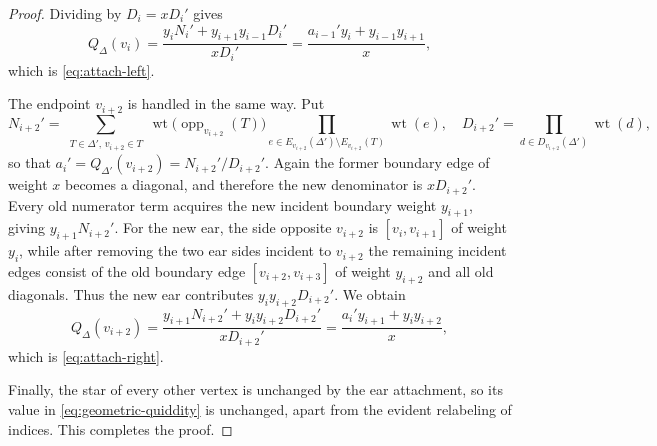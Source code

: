 \documentclass[amstex,11pt,reqno]{amsart}
\newtheorem{proposition}[theorem]{Proposition}
\theoremstyle{definition}
\newcommand{\wt}{\operatorname{wt}}
\newcommand{\ba}{\bm{a}}
\begin{document}
\begin{proof}
Dividing by $D_i=xD_i'$ gives
\[
 Q_\Delta(v_i)
 =\frac{y_iN_i'+y_{i+1}y_{i-1}D_i'}{xD_i'}
 =\frac{a_{i-1}'y_i+y_{i-1}y_{i+1}}{x},
\]
which is \eqref{eq:attach-left}.

The endpoint $v_{i+2}$ is handled in the same way.
Put
\[
 N_{i+2}'
 =\sum_{\substack{T\in\Delta',\,v_{i+2}\in T}}
 \wt\bigl(\operatorname{opp}_{v_{i+2}}(T)\bigr)
 \prod_{e\in E_{v_{i+2}}(\Delta')\setminus E_{v_{i+2}}(T)}\wt(e),
 \quad
 D_{i+2}'=\prod_{d\in D_{v_{i+2}}(\Delta')}\wt(d),
\]
so that $a_i'=Q_{\Delta'}(v_{i+2})=N_{i+2}'/D_{i+2}'$. Again the former boundary edge of weight $x$ becomes a diagonal, and therefore the new denominator is $xD_{i+2}'$. Every old numerator term acquires the new incident boundary weight $y_{i+1}$, giving $y_{i+1}N_{i+2}'$. For the new ear, the side opposite $v_{i+2}$ is $[v_i,v_{i+1}]$ of weight $y_i$, while after removing the two ear sides incident to $v_{i+2}$ the remaining incident edges consist of the old boundary edge $[v_{i+2},v_{i+3}]$ of weight $y_{i+2}$ and all old diagonals. Thus the new ear contributes $y_i y_{i+2}D_{i+2}'$. We obtain
\[
 Q_\Delta(v_{i+2})
 =\frac{y_{i+1}N_{i+2}'+y_i y_{i+2}D_{i+2}'}{xD_{i+2}'}
 =\frac{a_i'y_{i+1}+y_i y_{i+2}}{x},
\]
which is \eqref{eq:attach-right}.

Finally, the star of every other vertex is unchanged by the ear attachment, so its value in \eqref{eq:geometric-quiddity} is unchanged, apart from the evident relabeling of indices. This completes the proof.
\end{proof}

\end{document}
